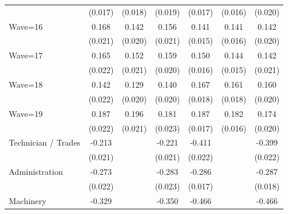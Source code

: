 {\begin{tabular}{l*{6}{c}}
                    &     (0.017)         &     (0.018)         &     (0.019)         &     (0.017)         &     (0.016)         &     (0.020)         \\
Wave=16             &       0.168\sym{***}&       0.142\sym{***}&       0.156\sym{***}&       0.141\sym{***}&       0.141\sym{***}&       0.142\sym{***}\\
                    &     (0.021)         &     (0.020)         &     (0.021)         &     (0.015)         &     (0.016)         &     (0.020)         \\
Wave=17             &       0.165\sym{***}&       0.152\sym{***}&       0.159\sym{***}&       0.150\sym{***}&       0.144\sym{***}&       0.142\sym{***}\\
                    &     (0.022)         &     (0.021)         &     (0.020)         &     (0.016)         &     (0.015)         &     (0.021)         \\
Wave=18             &       0.142\sym{***}&       0.129\sym{***}&       0.140\sym{***}&       0.167\sym{***}&       0.161\sym{***}&       0.160\sym{***}\\
                    &     (0.022)         &     (0.020)         &     (0.020)         &     (0.018)         &     (0.018)         &     (0.020)         \\
Wave=19             &       0.187\sym{***}&       0.196\sym{***}&       0.181\sym{***}&       0.187\sym{***}&       0.182\sym{***}&       0.174\sym{***}\\
                    &     (0.022)         &     (0.021)         &     (0.023)         &     (0.017)         &     (0.016)         &     (0.020)         \\
Technician / Trades &      -0.213\sym{***}&                     &      -0.221\sym{***}&      -0.411\sym{***}&                     &      -0.399\sym{***}\\
                    &     (0.021)         &                     &     (0.021)         &     (0.022)         &                     &     (0.022)         \\
Administration      &      -0.273\sym{***}&                     &      -0.283\sym{***}&      -0.286\sym{***}&                     &      -0.287\sym{***}\\
                    &     (0.022)         &                     &     (0.023)         &     (0.017)         &                     &     (0.018)         \\
Machinery           &      -0.329\sym{***}&                     &      -0.350\sym{***}&      -0.466\sym{***}&                     &      -0.466\sym{***}\\

\end{tabular}}
